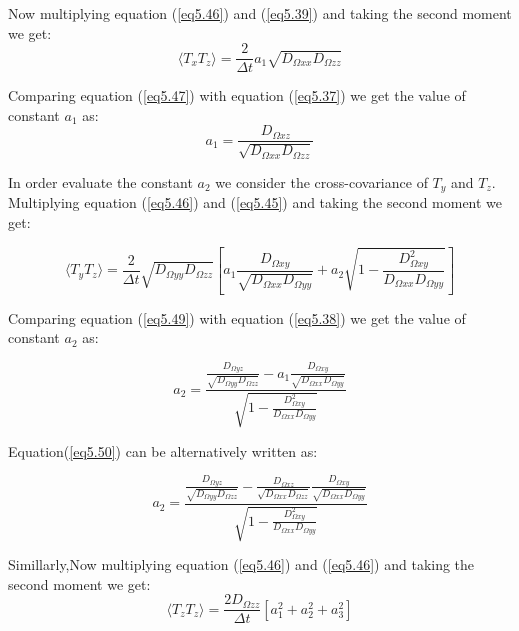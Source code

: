 Now multiplying equation (\ref{eq5.46}) and (\ref{eq5.39}) and taking the second moment we get:
\begin{equation}
	\label{eq5.47}
	\langle T_x T_z\rangle=\frac{2}{\Delta t}a_1\sqrt{D_{\Omega{xx}}D_{\Omega{zz}}}
\end{equation} 

Comparing equation (\ref{eq5.47}) with equation (\ref{eq5.37}) we get the value of constant $a_1$ as:
\begin{equation}
	\label{eq5.48}
	a_1=\frac{D_{\Omega{xz}}}{\sqrt{D_{\Omega{xx}}D_{\Omega{zz}}}}
\end{equation}

In order evaluate the constant $a_2$ we consider the cross-covariance of $T_y$ and $T_z$.
Multiplying equation (\ref{eq5.46}) and (\ref{eq5.45}) and taking the second moment we get:

\begin{equation}
	\label{eq5.49}
	\langle T_y T_z\rangle=\frac{2}{\Delta t}\sqrt{D_{\Omega{yy}}D_{\Omega{zz}}}[a_1\frac{D_{\Omega{xy}}}{\sqrt{D_{\Omega{xx}}D_{\Omega{yy}}}}+a_2\sqrt{1-\frac{D_{\Omega{xy}}^2}{D_{\Omega{xx}}D_{\Omega{yy}}}}]
\end{equation}

Comparing equation (\ref{eq5.49}) with equation (\ref{eq5.38}) we get the value of constant $a_2$ as:

\begin{equation}
	\label{eq5.50}
	a_2=\frac{\frac{D_{\Omega{yz}}}{\sqrt{D_{\Omega{yy}}D_{\Omega{zz}}}}-a_1\frac{D_{\Omega{xy}}}{\sqrt{D_{\Omega{xx}}D_{\Omega{yy}}}}}{\sqrt{1-\frac{D_{\Omega{xy}}^2}{D_{\Omega{xx}}D_{\Omega{yy}}}}}
\end{equation} 

Equation(\ref{eq5.50}) can be alternatively written as:

\begin{equation}
	\label{eq5.51}
	a_2=\frac{\frac{D_{\Omega{yz}}}{\sqrt{D_{\Omega{yy}}D_{\Omega{zz}}}}-\frac{D_{\Omega{xz}}}{\sqrt{D_{\Omega{xx}}D_{\Omega{zz}}}}\frac{D_{\Omega{xy}}}{\sqrt{D_{\Omega{xx}}D_{\Omega{yy}}}}}{\sqrt{1-\frac{D_{\Omega{xy}}^2}{D_{\Omega{xx}}D_{\Omega{yy}}}}}
\end{equation}

Simillarly,Now multiplying equation (\ref{eq5.46}) and (\ref{eq5.46}) and taking the second moment we get:
\begin{equation}
	\label{eq5.52}
	\langle T_z T_z\rangle=\frac{2D_{\Omega{zz}}}{\Delta t}[a_1^2+a_2^2+a_3^2]
\end{equation}


